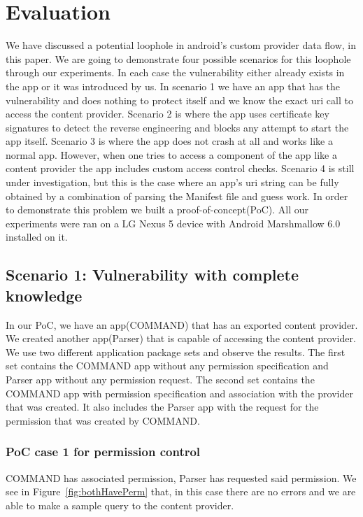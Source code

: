 \section{Evaluation}
\label{eval}
We have discussed a potential loophole in android's custom provider data flow, in this paper. We are going to demonstrate four possible scenarios for this loophole through our experiments. In each case the vulnerability either already exists in the app or it was introduced by us. In scenario 1 we have an app that has the vulnerability and does nothing to protect itself and we know the exact uri call to access the content provider. Scenario 2 is where the app uses certificate key signatures to detect the reverse engineering and blocks any attempt to start the app itself. Scenario 3 is where the app does not crash at all and works like a normal app. However, when one tries to access a component of the app like a content provider the app includes custom access control checks. Scenario 4 is still under investigation, but this is the case  where an app's uri string can be fully obtained by a combination of parsing the Manifest file and guess work. In order to demonstrate this problem we built a proof-of-concept(PoC). All our experiments were ran on a LG Nexus 5 device with Android Marshmallow 6.0 installed on it.

\subsection{Scenario 1: Vulnerability with complete knowledge}In our PoC, we have an app(COMMAND) that has an exported content provider. We created another app(Parser) that is capable of accessing the content provider. We use two different application package sets and observe the results. The first set contains the COMMAND app without any permission specification and Parser app without any permission request. The second set contains the COMMAND app with permission specification and association with the provider that was created. It also includes the Parser app with the request for the permission that was created by COMMAND. 

\subsubsection{PoC case 1 for permission control} COMMAND has associated permission, Parser has requested said permission. We see in Figure~\ref{fig:bothHavePerm} that, in this case there are no errors and we are able to make a sample query to the content provider.

